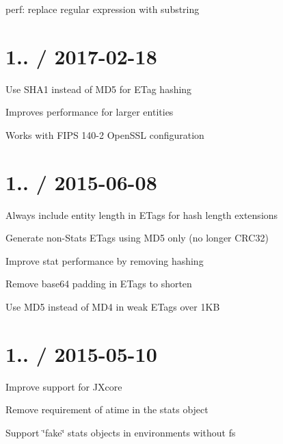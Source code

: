 
\begin{DoxyItemize}
\item perf\+: replace regular expression with substring
\end{DoxyItemize}

\section*{1.. / 2017-\/02-\/18 }


\begin{DoxyItemize}
\item Use S\+H\+A1 instead of M\+D5 for E\+Tag hashing
\begin{DoxyItemize}
\item Improves performance for larger entities
\item Works with F\+I\+PS 140-\/2 Open\+S\+SL configuration
\end{DoxyItemize}
\end{DoxyItemize}

\section*{1.. / 2015-\/06-\/08 }


\begin{DoxyItemize}
\item Always include entity length in E\+Tags for hash length extensions
\item Generate non-\/\+Stats E\+Tags using M\+D5 only (no longer C\+R\+C32)
\item Improve stat performance by removing hashing
\item Remove base64 padding in E\+Tags to shorten
\item Use M\+D5 instead of M\+D4 in weak E\+Tags over 1\+KB
\end{DoxyItemize}

\section*{1.. / 2015-\/05-\/10 }


\begin{DoxyItemize}
\item Improve support for J\+Xcore
\item Remove requirement of {\ttfamily atime} in the stats object
\item Support \char`\"{}fake\char`\"{} stats objects in environments without {\ttfamily fs}
\end{DoxyItemize}

